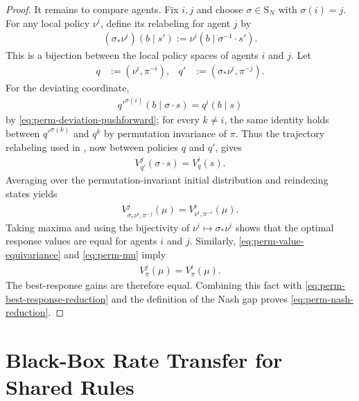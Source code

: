 \documentclass{article}
\theoremstyle{plain}
\theoremstyle{definition}
\theoremstyle{remark}
\newcommand{\Sym}{\mathrm{S}}
\begin{document}
\begin{proof}
It remains to compare agents. Fix $i,j$ and choose
$\sigma\in\Sym_N$ with $\sigma(i)=j$. For any local policy $\nu^i$, define its
relabeling for agent $j$ by
\begin{align}
  (\sigma_*\nu^i)(b\mid s')
  :=
  \nu^i(b\mid\sigma^{-1}\mathbin{\cdot}s').
  \label{eq:perm-deviation-pushforward}
\end{align}
This is a bijection between the local policy spaces of agents $i$ and $j$.
Let
\begin{align*}
  q
  &:=
  (\nu^i,\pi^{-i}),&
  q'
  &:=
  (\sigma_*\nu^i,\pi^{-j}).
\end{align*}
For the deviating coordinate,
\begin{align*}
  q'^{\sigma(i)}(b\mid\sigma\mathbin{\cdot}s)
  =
  q^i(b\mid s)
\end{align*}
by \eqref{eq:perm-deviation-pushforward}; for every $k\ne i$, the same identity
holds between $q'^{\sigma(k)}$ and $q^k$ by permutation invariance of $\pi$.
Thus the trajectory relabeling used in
, now between policies $q$ and $q'$, gives
\begin{align*}
  V^j_{q'}(\sigma\mathbin{\cdot}s)
  =
  V^i_q(s).
\end{align*}
Averaging over the permutation-invariant initial distribution and reindexing
states yields
\begin{align*}
  V^j_{\sigma_*\nu^i,\pi^{-j}}(\mu)
  =
  V^i_{\nu^i,\pi^{-i}}(\mu).
\end{align*}
Taking maxima and using the bijectivity of $\nu^i\mapsto\sigma_*\nu^i$ shows that
the optimal response values are equal for agents $i$ and $j$. Similarly,
\eqref{eq:perm-value-equivariance} and \eqref{eq:perm-mu} imply
\begin{align*}
  V^j_\pi(\mu)
  =
  V^i_\pi(\mu).
\end{align*}
The best-response gains are therefore equal. Combining this fact with
\eqref{eq:perm-best-response-reduction} and the definition of the Nash gap proves
\eqref{eq:perm-nash-reduction}.
\end{proof}

\section{Black-Box Rate Transfer for Shared Rules}
\label{app:proof-perm-rate-transfer}
\end{document}
